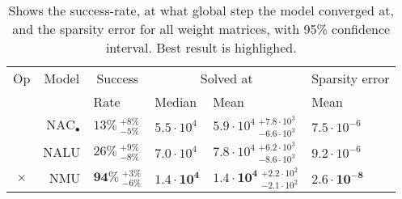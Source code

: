 \begin{table}[!h]

\caption{\label{tab:very-simple-function-results}Shows the success-rate, at what global step the model converged at, and the sparsity error for all weight matrices, with 95\% confidence interval. Best result is highlighed.}
\centering
\begin{tabular}{crllll}
\toprule
\multicolumn{1}{c}{Op} & \multicolumn{1}{c}{Model} & \multicolumn{1}{c}{Success} & \multicolumn{2}{c}{Solved at} & \multicolumn{1}{c}{Sparsity error} \\
\cmidrule(l{3pt}r{3pt}){1-1} \cmidrule(l{3pt}r{3pt}){2-2} \cmidrule(l{3pt}r{3pt}){3-3} \cmidrule(l{3pt}r{3pt}){4-5} \cmidrule(l{3pt}r{3pt}){6-6}
 &  & Rate & Median & Mean & Mean\\
\midrule
 & $\mathrm{NAC}_{\bullet}$ & $13\% {~}^{+8\%}_{-5\%}$ & $5.5 \cdot 10^{4}$ & $5.9 \cdot 10^{4} {~}^{+7.8 \cdot 10^{3}}_{-6.6 \cdot 10^{3}}$ & $7.5 \cdot 10^{-6}$\\

 & NALU & $26\% {~}^{+9\%}_{-8\%}$ & $7.0 \cdot 10^{4}$ & $7.8 \cdot 10^{4} {~}^{+6.2 \cdot 10^{3}}_{-8.6 \cdot 10^{3}}$ & $9.2 \cdot 10^{-6}$\\

\multirow{-3}{*}{\centering\arraybackslash $\bm{\times}$} & NMU & $\mathbf{94\%} {~}^{+3\%}_{-6\%}$ & $\mathbf{1.4 \cdot 10^{4}}$ & $\mathbf{1.4 \cdot 10^{4}} {~}^{+2.2 \cdot 10^{2}}_{-2.1 \cdot 10^{2}}$ & $\mathbf{2.6 \cdot 10^{-8}}$\\
\bottomrule
\end{tabular}
\end{table}
